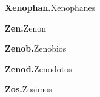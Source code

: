 \begin{footnotesize}
\begin{description}[%
				style=nextline,
				leftmargin=2cm,
				]
\item[Xenophan] \textbf{Xenophan.}\newline Xenophanes\newline 
\item[Zen] \textbf{Zen.}\newline Zenon\newline 
\item[Zenob] \textbf{Zenob.}\newline Zenobios\newline 
\item[Zenod] \textbf{Zenod.}\newline Zenodotos\newline 
\item[Zos] \textbf{Zos.}\newline Zosimos\newline 


\end{description}
\end{footnotesize}
